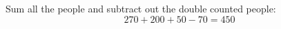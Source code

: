 \documentclass[12pt,letterpaper,boxed]{hmcpset}
\begin{document}
\begin{solution}

Sum all the people and subtract out the double counted people:
$$270+200+50-70 = \boxed{450}$$

\end{solution}
\end{document}

